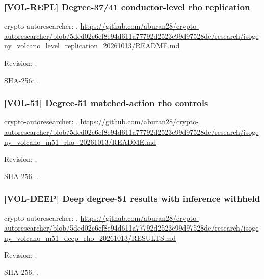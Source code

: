 \par\noindent\begin{minipage}{\linewidth}\small
\subsubsection*{[VOL-REPL] Degree-37/41 conductor-level rho replication}\label{art:VOL-REPL}
crypto-autoresearcher: .
\url{https://github.com/aburan28/crypto-autoresearcher/blob/5dcd02c6ef8e94d611a77792d2523e99d97528dc/research/isogeny_volcano_level_replication_20261013/README.md}
\par Revision: .
\par SHA-256: .
\end{minipage}\par\medskip

\par\noindent\begin{minipage}{\linewidth}\small
\subsubsection*{[VOL-51] Degree-51 matched-action rho controls}\label{art:VOL-51}
crypto-autoresearcher: .
\url{https://github.com/aburan28/crypto-autoresearcher/blob/5dcd02c6ef8e94d611a77792d2523e99d97528dc/research/isogeny_volcano_m51_rho_20261013/README.md}
\par Revision: .
\par SHA-256: .
\end{minipage}\par\medskip

\par\noindent\begin{minipage}{\linewidth}\small
\subsubsection*{[VOL-DEEP] Deep degree-51 results with inference withheld}\label{art:VOL-DEEP}
crypto-autoresearcher: .
\url{https://github.com/aburan28/crypto-autoresearcher/blob/5dcd02c6ef8e94d611a77792d2523e99d97528dc/research/isogeny_volcano_m51_deep_rho_20261013/RESULTS.md}
\par Revision: .
\par SHA-256: .
\end{minipage}\par\medskip

